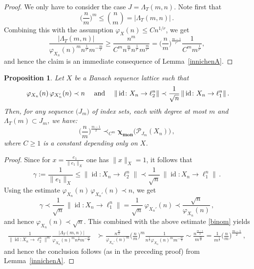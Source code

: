 \documentclass[12pt]{amsart}
\numberwithin{subsection}{section}
\newtheorem{proposition}[theorem]{Proposition}
\theoremstyle{definition}
\theoremstyle{remark}
\DeclareMathOperator{\mon}{mon}
\DeclareMathOperator{\id}{\mathrm{id}}
\newcommand{\chimon}{\chi_{\mon}}
\begin{document}
\begin{proof}
We only have to consider the case $J = \Lambda_T(m,n)$. Note first that
\begin{equation} \label{binom}
\Big(\frac{n}{m}\Big)^m \leq \binom{n}{m} = |\Lambda_T(m,n)|\,.
\end{equation}
Combining this  with the assumption  $\varphi_X(n) \leq C n^{1/r}$, we get
\[
\frac{|\Lambda_T(m,n)|}{\varphi_{X_n}(n)^m n^{\frac{1}{r'}} m ^{-\frac{m}{r}}} \ge
\frac{n^m}{C^m n^{\frac{m}{r}} n^{\frac{1}{r'}}  m^{\frac{m}{r'}}}
=  \Big( \frac{n}{m} \Big)^{\frac{m-1}{r'}}  \frac{1}{C^m m^\frac{1}{r'}},
\]
and hence the claim is an immediate consequence of Lemma~\ref{innichenA}.
\end{proof}


\begin{proposition} \label{toblach}
Let $X$ be a Banach sequence lattice  such that
\begin{equation} \label{M}
\text{
$\varphi_{X_n}(n)\,\varphi_{X_{n}'}(n) \prec n$
\quad and \quad
$\|\id \colon X_n \to \ell_2^{n}\| \prec \frac{1}{\sqrt{n}}\,\|\id\colon X_n \to \ell_1^{n}\|\,.$}
\end{equation}
Then, for any sequence $\big(J_m\big)$ of index sets, each with degree at most $m$
and $\Lambda_T(m)\subset J_m$, we have{\rm:}
\[
\Big( \frac{n}{m} \Big)^{\frac{m-1}{2}} \prec_{C^m}
\boldsymbol{\chimon}\big(\mathcal{P}_{J_m}(X_n)\big)\,,
\]
where $C \ge 1$ is a constant depending only on $X$.
\end{proposition}


\begin{proof}
Since for $x =\frac{e_1}{\|e_1\|_X}$ one has $\|x\|_X=1$, it follows that
\[
\gamma:=\frac{1}{{\|e_1\|_X}} \leq \|\id\colon X_n \to \ell_2^{n}\| \prec \frac{1}{\sqrt{n}}\,\|\id\colon X_n \to \ell_1^{n}\|\,.
\]
Using the estimate $\varphi_{X_n}(n)\,\varphi_{X_{n}'}(n) \prec n$, we get
\[
\gamma \prec \frac{1}{\sqrt{n}}\,\|\id\colon X_n \to \ell_1^{n}\| = \frac{1}{\sqrt{n}}\,\varphi_{X_{n}'}(n)
\prec \frac{\sqrt{n}}{\varphi_{X_n}(n)}\,,
\]
and hence $\varphi_{X_n}(n)\prec \sqrt{n}$. This combined with the above estimate \eqref{binom} yields
\begin{align*}
\frac{1}{\|\id \colon X_n\to \ell_2^n\|^m}\frac{|\Lambda_T(m,n)|}{\varphi_{X_n}(n)^m n^{\frac{1}{2}} m ^{-\frac{m}{2}}}
& \succ \frac{n^\frac{m}{2}}{\varphi_{X_{n}'}(n)^m} \Big(\frac{n}{m}\Big)^m \frac{1}{n^\frac{1}{2}
\varphi_{X_n}(n)^m  m^{-\frac{m}{2}}}
\sim \frac{n^{\frac{m-1}{2}}}{m^{\frac{m}{2}}} = \frac{1}{m^{\frac{1}{2}}}\Big( \frac{n}{m} \Big)^{\frac{m-1}{2}}\,,
\end{align*}
and hence  the conclusion follows (as in the preceding proof) from Lemma~\ref{innichenA}.
\end{proof}
\end{document}
